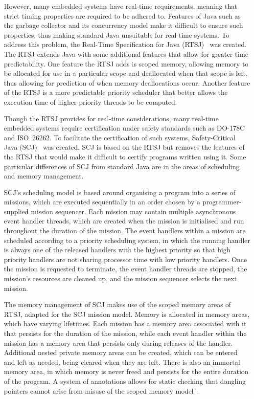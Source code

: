 \documentclass[a4paper,10pt]{report}
\begin{document}
However, many embedded systems have real-time requirements, meaning
that strict timing properties are required to be adhered to.
Features of Java such as the garbage collector and its concurrency
model make it difficult to ensure such properties, thus making
standard Java unsuitable for real-time systems.
To address this problem, the Real-Time Specification for Java
(RTSJ)~\cite{gosling2000} was created.
The RTSJ extends Java with some additional features that allow for
greater time predictability.
One feature the RTSJ adds is scoped memory, allowing memory to be
allocated for use in a particular scope and deallocated when that
scope is left, thus allowing for prediction of when memory
deallocations occur.
Another feature of the RTSJ is a more predictable priority scheduler
that better allows the execution time of higher priority threads to be
computed.

Though the RTSJ provides for real-time considerations, many real-time
embedded systems require certification under safety standards such as
\mbox{DO-178C} and ISO~26262.
To facilitate the certification of such systems, Safety-Critical Java
(SCJ)~\cite{locke2013} was created.
SCJ is based on the RTSJ but removes the features of the RTSJ that
would make it difficult to certify programs written using it.
Some particular differences of SCJ from standard Java are in the areas
of scheduling and memory management.

SCJ's scheduling model is based around organising a program into a
series of missions, which are executed sequentially in an order chosen
by a programmer-supplied mission sequencer.
Each mission may contain multiple asynchronous event handler threads,
which are created when the mission is initialised and run throughout
the duration of the mission.
The event handlers within a mission are scheduled according to a
priority scheduling system, in which the running handler is always one
of the released handlers with the highest priority so that high
priority handlers are not sharing processor time with low priority
handlers.
Once the mission is requested to terminate, the event handler threads
are stopped, the mission's resources are cleaned up, and the mission
sequencer selects the next mission.

The memory management of SCJ makes use of the scoped memory areas of
RTSJ, adapted for the SCJ mission model.
Memory is allocated in memory areas, which have varying lifetimes.
Each mission has a memory area associated with it that persists for
the duration of the mission, while each event handler within the
mission has a memory area that persists only during releases of the
handler.
Additional nested private memory areas can be created, which can be
entered and left as needed, being cleared when they are left.
There is also an immortal memory area, in which memory is never freed
and persists for the entire duration of the program.
A system of annotations allows for static checking that dangling
pointers cannot arise from misuse of the scoped memory
model~\cite{tang2010}.
\end{document}
